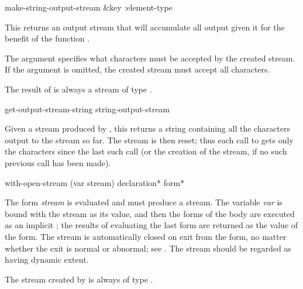 \begin{defun}[Function]
make-string-output-stream &key :element-type

This returns an output stream that will 
accumulate all output given it for the benefit of the function
.

The  argument specifies what characters
must be accepted by the created stream.  If the  argument
is omitted, the created stream must accept all characters.

The result of
 is always a stream of type .
\end{defun}

\begin{defun}[Function]
get-output-stream-string string-output-stream

Given a stream produced by , this
returns a string containing all the characters output to the stream so far.
The stream is then reset; thus each call to 
gets only the characters since the last such call (or the creation
of the stream, if no such previous call has been made).
\end{defun}

\begin{defmac}
with-open-stream (var stream) {declaration}* {form}*

The form \emph{stream} is evaluated and must produce a stream.
The variable \emph{var} is bound with the stream as its value,
and then the forms of the body are executed
as an implicit ; the results of evaluating
the last form are returned as the value of the  form.
The stream
is automatically closed on exit from the  form,
no matter whether the exit is normal or abnormal;
see .
The stream should be regarded as having dynamic extent.

The stream created by
 is always of type .
\end{defmac}

